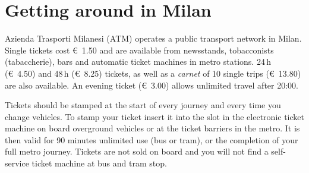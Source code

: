 \newpage
\section*{Getting around in Milan}
\label{getting-around}
\pagestyle{cropmarksstyle}
Azienda Trasporti Milanesi (ATM) operates a public transport network in Milan. Single tickets cost
€~1.50 and are available from newsstands, tobacconists (tabaccherie), bars and automatic ticket
machines in metro stations. 24\,h (€~4.50) and 48\,h (€~8.25) tickets, as well as a \emph{carnet} of 10 single
trips (€~13.80) are also available. An evening ticket (€~3.00) allows unlimited travel after 20:00.

Tickets should be stamped at the start of every journey and every time you change vehicles. To stamp
your ticket insert it into the slot in the electronic ticket machine on board overground vehicles or
at the ticket barriers in the metro. It is then valid for 90 minutes unlimited use (bus or tram), or
the completion of your full metro journey. Tickets are not sold on board and you will not find a
self-service ticket machine at bus and tram stop.
